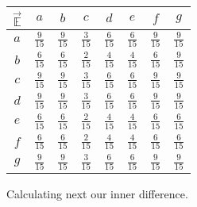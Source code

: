 \documentclass[a4paper, 10pt, twocolumn]{article}
\begin{document}
\begin{center}
       \begin{tabular}{c|ccccccc} 
              $ \vec{\mathbb{E}} $ & $ a $ & $ b $ & $ c $ & $ d $ & $ e $ & $ f $ & $ g $ \\
              \hline
              $ a $ & $ \frac{9}{15} $ & $ \frac{9}{15} $ & $ \frac{3}{15} $ & $ \frac{6}{15} $ & $ \frac{6}{15} $ & $ \frac{9}{15} $ & $ \frac{9}{15} $ \\
              $ b $ & $ \frac{6}{15} $ & $ \frac{6}{15} $ & $ \frac{2}{15} $ & $ \frac{4}{15} $ & $ \frac{4}{15} $ & $ \frac{6}{15} $ & $ \frac{9}{15} $ \\
              $ c $ & $ \frac{9}{15} $ & $ \frac{9}{15} $ & $ \frac{3}{15} $ & $ \frac{6}{15} $ & $ \frac{6}{15} $ & $ \frac{9}{15} $ & $ \frac{9}{15} $ \\
              $ d $ & $ \frac{9}{15} $ & $ \frac{9}{15} $ & $ \frac{3}{15} $ & $ \frac{6}{15} $ & $ \frac{6}{15} $ & $ \frac{9}{15} $ & $ \frac{9}{15} $ \\
              $ e $ & $ \frac{6}{15} $ & $ \frac{6}{15} $ & $ \frac{2}{15} $ & $ \frac{4}{15} $ & $ \frac{4}{15} $ & $ \frac{6}{15} $ & $ \frac{6}{15} $ \\
              $ f $ & $ \frac{6}{15} $ & $ \frac{6}{15} $ & $ \frac{2}{15} $ & $ \frac{4}{15} $ & $ \frac{4}{15} $ & $ \frac{6}{15} $ & $ \frac{6}{15} $ \\
              $ g $ & $ \frac{9}{15} $ & $ \frac{9}{15} $ & $ \frac{3}{15} $ & $ \frac{6}{15} $ & $ \frac{6}{15} $ & $ \frac{9}{15} $ & $ \frac{9}{15} $ \\
       \end{tabular}
\end{center}

\noindent
Calculating next our inner difference.
\end{document}
